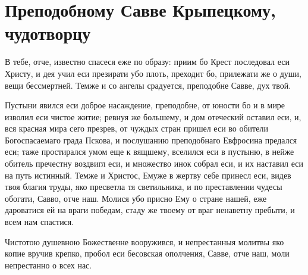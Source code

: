 \mychapterending


\section{Преподобному Савве Крыпецкому, чудотворцу}\begin{mymulticols}


В тебе, отче, известно спасеся еже по образу: приим бо Крест последовал еси Христу, и дея учил еси презирати убо плоть, преходит бо, прилежати же о души, вещи бессмертней. Темже и со ангелы срадуется, преподобне Савве, дух твой.


Пустыни явился еси доброе насаждение, преподобне, от юности бо и в мире изволил еси чистое житие; ревнуя же большему, и дом отеческий оставил еси, и, вся красная мира сего презрев, от чуждых стран пришел еси во обители Богоспасаемаго града Пскова, и послушанию преподобнаго Евфросина предался еси; таже простирался умом еще к вящшему, вселился еси в пустыню, в нейже обитель пречестну воздвигл еси, и множество инок собрал еси, и их наставил еси на путь истинный. Темже и Христос, Емуже в жертву себе принесл еси, видев твоя благия труды, яко пресветла тя светильника, и по преставлении чудесы обогати, Савво, отче наш. Молися убо присно Ему о стране нашей, еже дароватися ей на враги победам, стаду же твоему от враг ненаветну пребыти, и всем нам спастися.


Чистотою душевною Божественне вооружився, и непрестанныя молитвы яко копие вручив крепко, пробол еси бесовская ополчения, Савве, отче наш, моли непрестанно о всех нас.



\end{mymulticols}
